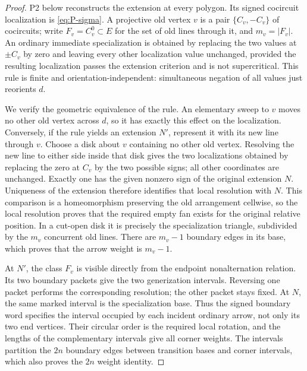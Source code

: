 \begin{proof}
P2 below reconstructs the extension at every polygon.  Its signed
cocircuit localization is \eqref{eq:P-sigma}.  A projective old vertex
$v$ is a pair $\{C_v,-C_v\}$ of cocircuits; write
$F_v=C_v^0\subset E$ for the set of old lines through it, and
$m_v=|F_v|$.  An ordinary immediate specialization is obtained by
replacing the two values at $\pm C_v$ by zero and leaving every other
localization value unchanged, provided the resulting localization
passes the extension criterion and is not supercritical.  This rule
is finite and orientation-independent: simultaneous negation of all
values just reorients $d$.

We verify the geometric equivalence of the rule.  An elementary sweep
to $v$ moves no other old vertex across $d$, so it has exactly this
effect on the localization.  Conversely, if the rule yields an
extension $N'$, represent it with its new line through $v$.  Choose a
disk about $v$ containing no other old vertex.  Resolving the new line
to either side inside that disk gives the two localizations obtained
by replacing the zero at $C_v$ by the two possible signs; all other
coordinates are unchanged.  Exactly one has the given nonzero sign
of the original extension $N$.  Uniqueness of the extension therefore
identifies that local resolution with $N$.  This comparison is a
homeomorphism preserving the old arrangement cellwise, so the local
resolution proves that the required empty fan exists for the original
relative position.  In a cut-open disk it is precisely the
specialization triangle, subdivided by the $m_v$ concurrent old
lines.  There are $m_v-1$ boundary edges in its base, which proves
that the arrow weight is $m_v-1$.

At $N'$, the class $F_v$ is visible directly from the endpoint
nonalternation relation.  Its two boundary packets give the two
generization intervals.  Reversing one packet performs the
corresponding resolution; the other packet stays fixed.  At $N$, the
same marked interval is the specialization base.  Thus the signed
boundary word specifies the interval occupied by each incident
ordinary arrow, not only its two end vertices.  Their circular order
is the required local rotation, and the lengths of the complementary
intervals give all corner weights.  The intervals partition the
$2n$ boundary edges between transition bases and corner intervals,
which also proves the $2n$ weight identity.


\end{proof}
